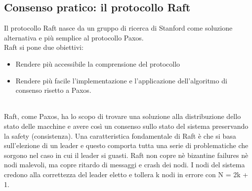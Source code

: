 \newpage
\subsection{Consenso pratico: il protocollo Raft}
Il protocollo Raft nasce da un gruppo di ricerca di Stanford come soluzione alternativa e più semplice al protocollo Paxos.\\
Raft si pone due obiettivi:
\begin{itemize}
    \item Rendere più accessibile la comprensione del protocollo
    \item Rendere più facile l'implementazione e l'applicazione dell'algoritmo di consenso risetto a Paxos.
\end{itemize}
\phantom \\

Raft, come Paxos, ha lo scopo di trovare una soluzione alla distribuzione dello stato delle macchine e avere così un consenso sullo stato del sistema preservando la safety (consistenza). Una caratteristica fondamentale di Raft è che si basa sull'elezione di un leader e questo comporta tutta una serie di problematiche che sorgono nel caso in cui il leader si guasti. Raft non copre nè bizantine failures nè nodi malevoli, ma copre ritardo di messaggi e crash dei nodi. I nodi del sistema credono alla correttezza del leader eletto e 
tollera k nodi in errore con N = 2k + 1.










